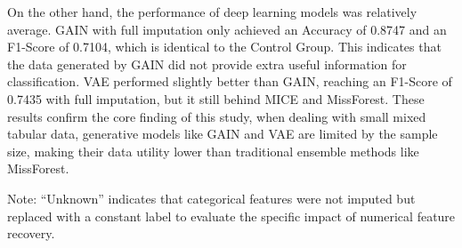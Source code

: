 \documentclass[twocolumn, 9pt]{extarticle}
\begin{document}
On the other hand, the performance of deep learning models was relatively average. GAIN with full imputation only achieved an Accuracy of 0.8747 and an F1-Score of 0.7104, which is identical to the Control Group. This indicates that the data generated by GAIN did not provide extra useful information for classification. VAE performed slightly better than GAIN, reaching an F1-Score of 0.7435 with full imputation, but it still behind MICE and MissForest. These results confirm the core finding of this study, when dealing with small mixed tabular data, generative models like GAIN and VAE are limited by the sample size, making their data utility lower than traditional ensemble methods like MissForest.
\begin{table}[ht]
\centering
\caption{Downstream Classification Performance on \textit{Boy or Girl} Dataset}
\label{tab:phase2_results}
\renewcommand{\arraystretch}{1.5} %
\setlength{\tabcolsep}{5pt}      %
\vspace{2pt}
\begin{flushleft}
\footnotesize{Note: ``Unknown'' indicates that categorical features were not imputed but replaced with a constant label to evaluate the specific impact of numerical feature recovery.}
\end{flushleft}
\end{table}
\end{document}
